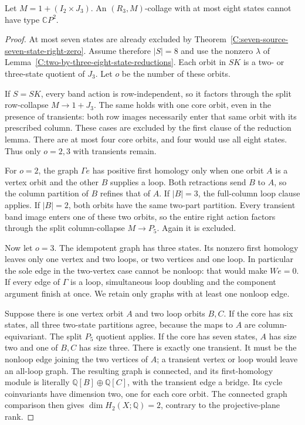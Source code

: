\begin{theorem}
\label{C:two-by-three-eight-state-right-zero}
Let $M=1+(I_2\times J_3)$.  An $(R_3,M)$-collage with
at most eight states cannot have type $\mathbb CP^2$.
\end{theorem}
\begin{proof}
At most seven states are already excluded by
Theorem~\ref{C:seven-source-seven-state-right-zero}.
Assume therefore $|S|=8$ and use the nonzero $\lambda$
of Lemma~\ref{C:two-by-three-eight-state-reductions}.
Each orbit in $SK$ is a two- or three-state quotient of
$J_3$.  Let $o$ be the number of these orbits.

If $S=SK$, every band action is row-independent, so it
factors through the split row-collapse $M\to1+J_3$.
The same holds with one core orbit, even in the presence
of transients: both row images necessarily enter that
same orbit with its prescribed column.  These cases are
excluded by the first clause of the reduction lemma.
There are at most four core orbits, and four would use
all eight states.  Thus only $o=2,3$ with transients remain.

For $o=2$, the graph $\Gamma e$ has positive first
homology only when one orbit $A$ is a vertex orbit and
the other $B$ supplies a loop.  Both retractions send
$B$ to $A$, so the column partition of $B$ refines that
of $A$.  If $|B|=3$, the full-column loop clause applies.
If $|B|=2$, both orbits have the same two-part partition.
Every transient band image enters one of these two
orbits, so the entire right action factors through the
split column-collapse $M\to P_5$.  Again it is excluded.

Now let $o=3$.  The idempotent graph has three states.
Its nonzero first homology leaves only one vertex and
two loops, or two vertices and one loop.  In particular
the sole edge in the two-vertex case cannot be nonloop:
that would make $We=0$.  If every edge of $\Gamma$ is
a loop, simultaneous loop doubling and the component
argument finish at once.  We retain only graphs with
at least one nonloop edge.

Suppose there is one vertex orbit $A$ and two loop
orbits $B,C$.  If the core has six states, all three
two-state partitions agree, because the maps to $A$
are column-equivariant.  The split $P_5$ quotient applies.
If the core has seven states, $A$ has size two and one
of $B,C$ has size three.  There is exactly one transient.
It must be the nonloop edge joining the two vertices
of $A$; a transient vertex or loop would leave an
all-loop graph.  The resulting graph is connected,
and its first-homology module is literally
$\mathbb Q[B]\oplus\mathbb Q[C]$, with the transient
edge a bridge.  Its cycle coinvariants have dimension
two, one for each core orbit.  The connected graph
comparison then gives $\dim H_2(X;\mathbb Q)=2$,
contrary to the projective-plane rank.


\end{proof}
